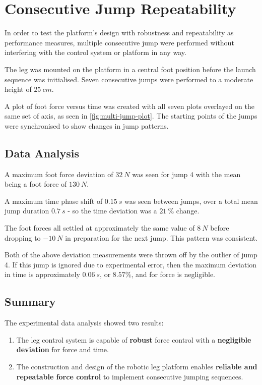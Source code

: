 \section{Consecutive Jump Repeatability}
\label{sec:Consecutive Jump Repeatability}

In order to test the platform's design with robustness and repeatability as performance measures, multiple consecutive jump were performed without interfering with the control system or platform in any way.  

The leg was mounted on the platform in a central foot position before the launch sequence was initialised. Seven consecutive jumps were performed to a moderate height of $25\ cm$. 

A plot of foot force versus time was created with all seven plots overlayed on the same set of axis, as seen in \cref{fig:multi-jump-plot}. The starting points of the jumps were synchronised to show changes in jump patterns. 

\subsection{Data Analysis}

A maximum foot force deviation of $32\ N$ was seen for jump 4 with the mean being a foot force of $130\ N$. 

A maximum time phase shift of $0.15\ s$ was seen between jumps, over a total mean jump duration $0.7\ s$ - so the time deviation was a $21\ \%$ change. 

The foot forces all settled at approximately the same value of $8\ N$ before dropping to $-10\ N$ in preparation for the next jump. This pattern was consistent.

Both of the above deviation measurements were thrown off by the outlier of jump 4. If this jump is ignored due to experimental error, then the maximum deviation in time is approximately $0.06\ s$, or $8.57\%$, and for force is negligible.

\subsection{Summary}

The experimental data analysis showed two results:
\begin{enumerate}
\item The leg control system is capable of \textbf{robust} force control with a \textbf{negligible deviation} for force and time.
\item The construction and design of the robotic leg platform enables \textbf{reliable and repeatable force control} to implement consecutive jumping sequences.
\end{enumerate}

